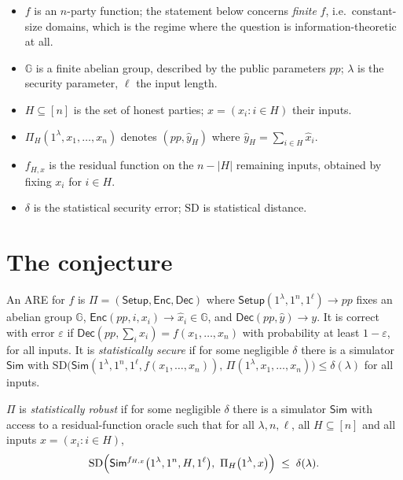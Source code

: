 \documentclass{aicr-conjecture}
\newcommand{\eps}{\varepsilon}
\newcommand{\Gr}{\mathbb{G}}
\newcommand{\Enc}{\mathsf{Enc}}
\newcommand{\Dec}{\mathsf{Dec}}
\newcommand{\Setup}{\mathsf{Setup}}
\newcommand{\Sim}{\mathsf{Sim}}
\newcommand{\SD}{\mathrm{SD}}
\begin{document}
\begin{itemize}[nosep]
  \item $f$ is an $n$-party function; the statement below concerns
    \emph{finite} $f$, i.e.\ constant-size domains, which is the regime
    where the question is information-theoretic at all.
  \item $\Gr$ is a finite abelian group, described by the public
    parameters $pp$; $\lambda$ is the security parameter, $\ell$ the
    input length.
  \item $H \subseteq [n]$ is the set of honest parties; $x = (x_{i} : i
    \in H)$ their inputs.
  \item $\Pi_{H}(1^{\lambda}, x_{1}, \dots, x_{n})$ denotes $(pp,
    \widehat{y}_{H})$ where $\widehat{y}_{H} = \sum_{i \in
    H}\widehat{x}_{i}$.
  \item $f_{H,x}$ is the residual function on the $n - |H|$ remaining
    inputs, obtained by fixing $x_{i}$ for $i \in H$.
  \item $\delta$ is the statistical security error; $\SD$ is statistical
    distance.
\end{itemize}

\section{The conjecture}\label{sec:conjectures}

\begin{definition}
  \label{def:are}
An ARE for $f$ is $\Pi = (\Setup, \Enc, \Dec)$ where $\Setup(1^{\lambda},
1^{n}, 1^{\ell}) \to pp$ fixes an abelian group $\Gr$, $\Enc(pp, i,
x_{i}) \to \widehat{x}_{i} \in \Gr$, and $\Dec(pp, \widehat{y}) \to y$.
It is correct with error $\eps$ if $\Dec(pp, \sum_{i}\widehat{x}_{i}) =
f(x_{1},\dots,x_{n})$ with probability at least $1 - \eps$, for all
inputs. It is \emph{statistically secure} if for some negligible $\delta$
there is a simulator $\Sim$ with
$\SD\bigl(\Sim(1^{\lambda},1^{n},1^{\ell},f(x_{1},\dots,x_{n})),\,
\Pi(1^{\lambda},x_{1},\dots,x_{n})\bigr) \le \delta(\lambda)$ for all
inputs.
\end{definition}

\begin{definition}
  \label{def:robust}
$\Pi$ is \emph{statistically robust} if for some negligible $\delta$
there is a simulator $\Sim$ with access to a residual-function oracle
such that for all $\lambda, n, \ell$, all $H \subseteq [n]$ and all
inputs $x = (x_{i} : i \in H)$,
\[
  \SD\Bigl( \Sim^{f_{H,x}}\bigl(1^{\lambda}, 1^{n}, H, 1^{\ell}\bigr),\
  \Pi_{H}\bigl(1^{\lambda}, x\bigr) \Bigr) \;\le\; \delta(\lambda).
\]
\end{definition}
\end{document}
